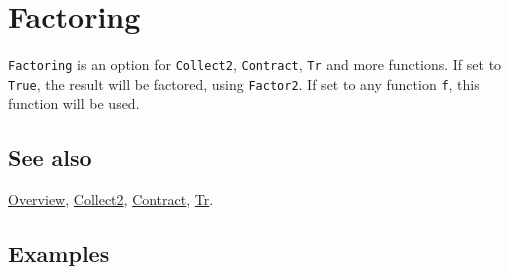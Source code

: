 \documentclass[../FeynCalcManual.tex]{subfiles}
\begin{document}
\hypertarget{factoring}{%
\section{Factoring}\label{factoring}}

\texttt{Factoring} is an option for \texttt{Collect2},
\texttt{Contract}, \texttt{Tr} and more functions. If set to
\texttt{True}, the result will be factored, using \texttt{Factor2}. If
set to any function \texttt{f}, this function will be used.

\subsection{See also}

\hyperlink{toc}{Overview}, \hyperlink{collect2}{Collect2},
\hyperlink{contract}{Contract}, \hyperlink{tr}{Tr}.

\subsection{Examples}
\end{document}
